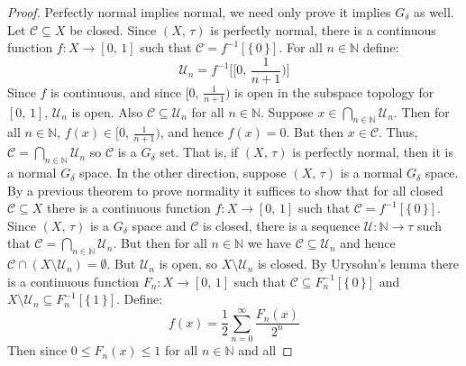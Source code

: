 \documentclass{article}
\theoremstyle{plain}
\theoremstyle{normal}
\begin{document}
        \begin{proof}
            Perfectly normal implies normal, we need only prove it implies
            $G_{\delta}$ as well. Let $\mathcal{C}\subseteq{X}$ be closed.
            Since $(X,\,\tau)$ is perfectly normal, there is a continuous
            function $f:X\rightarrow[0,\,1]$ such that
            $\mathcal{C}=f^{-1}[\{\,0\,\}]$. For all $n\in\mathbb{N}$ define:
            \begin{equation}
                \mathcal{U}_{n}=f^{-1}\big[[0,\,\frac{1}{n+1})\big]
            \end{equation}
            Since $f$ is continuous, and since $[0,\,\frac{1}{n+1})$ is open in
            the subspace topology for $[0,\,1]$, $\mathcal{U}_{n}$ is open.
            Also $\mathcal{C}\subseteq\mathcal{U}_{n}$ for all $n\in\mathbb{N}$.
            Suppose $x\in\bigcap_{n\in\mathbb{N}}\mathcal{U}_{n}$.
            Then for all $n\in\mathbb{N}$, $f(x)\in[0,\,\frac{1}{n+1})$, and
            hence $f(x)=0$. But then $x\in\mathcal{C}$. Thus,
            $\mathcal{C}=\bigcap_{n\in\mathbb{N}}\mathcal{U}_{n}$ so
            $\mathcal{C}$ is a $G_{\delta}$ set. That is, if $(X,\,\tau)$ is
            perfectly normal, then it is a normal $G_{\delta}$ space. In the
            other direction, suppose $(X,\,\tau)$ is a normal $G_{\delta}$
            space. By a previous theorem to prove normality it suffices to
            show that for all closed $\mathcal{C}\subseteq{X}$ there is a
            continuous function $f:X\rightarrow[0,\,1]$ such that
            $\mathcal{C}=f^{-1}[\{\,0\,\}]$. Since $(X,\,\tau)$ is a
            $G_{\delta}$ space and $\mathcal{C}$ is closed, there is a sequence
            $\mathcal{U}:\mathbb{N}\rightarrow\tau$ such that
            $\mathcal{C}=\bigcap_{n\in\mathbb{N}}\mathcal{U}_{n}$. But then
            for all $n\in\mathbb{N}$ we have
            $\mathcal{C}\subseteq\mathcal{U}_{n}$ and hence
            $\mathcal{C}\cap(X\setminus\mathcal{U}_{n})=\emptyset$. But
            $\mathcal{U}_{n}$ is open, so $X\setminus\mathcal{U}_{n}$ is closed.
            By Urysohn's lemma there is a continuous function
            $F_{n}:X\rightarrow[0,\,1]$ such that
            $\mathcal{C}\subseteq{F}_{n}^{-1}[\{\,0\,\}]$ and
            $X\setminus\mathcal{U}_{n}\subseteq{F}_{n}^{-1}[\{\,1\,\}]$. Define:
            \begin{equation}
                f(x)=\frac{1}{2}\sum_{n=0}^{\infty}\frac{F_{n}(x)}{2^{n}}
            \end{equation}
            Then since $0\leq{F}_{n}(x)\leq{1}$ for all $n\in\mathbb{N}$ and all

\end{proof}
\end{document}
